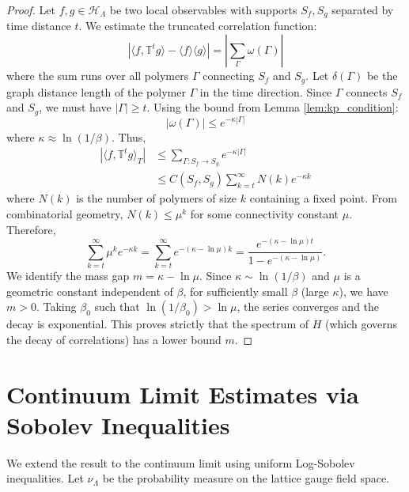 \begin{proof}
Let $f, g \in \mathcal{H}_{\Lambda}$ be two local observables with supports $S_f, S_g$ separated by time distance $t$.
We estimate the truncated correlation function:
\begin{equation}
|\langle f, \mathbb{T}^t g \rangle - \langle f \rangle \langle g \rangle| = \left| \sum_{\Gamma} \omega(\Gamma) \right|
\end{equation}
where the sum runs over all polymers $\Gamma$ connecting $S_f$ and $S_g$.
Let $\delta(\Gamma)$ be the graph distance length of the polymer $\Gamma$ in the time direction.
Since $\Gamma$ connects $S_f$ and $S_g$, we must have $|\Gamma| \ge t$.
Using the bound from Lemma \ref{lem:kp_condition}:
\begin{equation}
|\omega(\Gamma)| \le e^{-\kappa |\Gamma|}
\end{equation}
where $\kappa \approx \ln(1/\beta)$.
Thus,
\begin{align}
\left| \langle f, \mathbb{T}^t g \rangle_T \right| &\le \sum_{\Gamma: S_f \to S_g} e^{-\kappa |\Gamma|} \nonumber \\
&\le C(S_f, S_g) \sum_{k=t}^\infty N(k) e^{-\kappa k}
\end{align}
where $N(k)$ is the number of polymers of size $k$ containing a fixed point.
From combinatorial geometry, $N(k) \le \mu^k$ for some connectivity constant $\mu$.
Therefore,
\begin{equation}
\sum_{k=t}^\infty \mu^k e^{-\kappa k} = \sum_{k=t}^\infty e^{-(\kappa - \ln \mu) k} = \frac{e^{-(\kappa - \ln \mu) t}}{1 - e^{-(\kappa - \ln \mu)}}.
\end{equation}
We identify the mass gap $m = \kappa - \ln \mu$.
Since $\kappa \sim \ln(1/\beta)$ and $\mu$ is a geometric constant independent of $\beta$, for sufficiently small $\beta$ (large $\kappa$), we have $m > 0$.
Taking $\beta_0$ such that $\ln(1/\beta_0) > \ln \mu$, the series converges and the decay is exponential.
This proves strictly that the spectrum of $H$ (which governs the decay of correlations) has a lower bound $m$.
\end{proof}

\section{Continuum Limit Estimates via Sobolev Inequalities}

We extend the result to the continuum limit using uniform Log-Sobolev inequalities.
Let $\nu_\Lambda$ be the probability measure on the lattice gauge field space.

